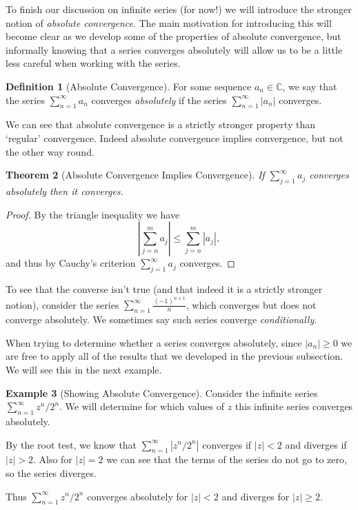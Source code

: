 \documentclass[11pt, a4paper]{article}
\newtheorem{theorem}{Theorem}[section]
\theoremstyle{definition}
\newtheorem{definition}[theorem]{Definition}
\newtheorem{example}[theorem]{Example}
\newcommand{\vocab}[1]{\emph{#1}} %
\newcommand{\C}{\mathbb{C}}
\begin{document}
To finish our discussion on infinite series (for now!) we will introduce the stronger notion of \emph{absolute convergence}. The main motivation for introducing this will become clear as we develop some of the properties of absolute convergence, but informally knowing that a series converges absolutely will allow us to be a little less careful when working with the series.

\begin{definition}[Absolute Convergence]
	For some sequence $a_n \in \C$, we say that the series $\sum_{n = 1}^{\infty} a_n$ converges \vocab{absolutely} if the series $\sum_{n = 1}^{\infty} |a_n|$ converges. 
\end{definition}

We can see that absolute convergence is a strictly stronger property than `regular' convergence. Indeed absolute convergence implies convergence, but not the other way round.

\begin{theorem}[Absolute Convergence Implies Convergence]
	If $\sum_{j = 1}^{\infty} a_j$ converges absolutely then it converges.
\end{theorem}
\begin{proof}
	By the triangle inequality we have
	$$
	\left|\sum_{j = n}^m a_j\right| \leq \sum_{j = n}^m \left|a_j\right|,
	$$
	and thus by Cauchy's criterion $\sum_{j = 1}^{\infty} a_j$ converges.
\end{proof}

To see that the converse isn't true (and that indeed it is a strictly stronger notion), consider the series $\sum_{n = 1}^{\infty} \frac{(-1)^{n + 1}}{n}$, which converges but does not converge absolutely. We sometimes say such series converge \vocab{conditionally}. 

When trying to determine whether a series converges absolutely, since $|a_n| \geq 0$ we are free to apply all of the results that we developed in the previous subsection. We will see this in the next example.

\begin{example}[Showing Absolute Convergence]
	Consider the infinite series $\sum_{n = 1}^{\infty} z^n/2^n$. We will determine for which values of $z$ this infinite series converges absolutely.
	
	By the root test, we know that $\sum_{n = 1}^{\infty} |z^n/2^n|$ converges if $|z| < 2$ and diverges if $|z| > 2$. Also for $|z| = 2$ we can see that the terms of the series do not go to zero, so the series diverges.

	Thus $\sum_{n = 1}^{\infty} z^n/2^n$ converges absolutely for $|z| < 2$ and diverges for $|z| \geq 2$.
\end{example}
\end{document}
